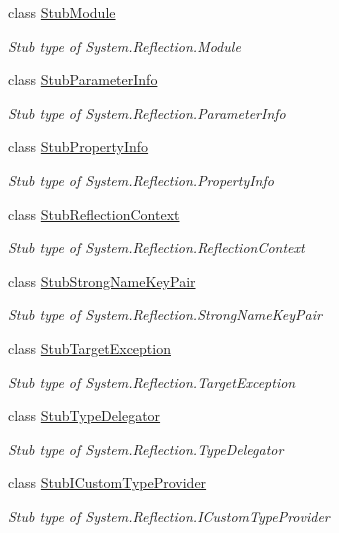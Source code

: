 \begin{DoxyCompactItemize}
class \hyperlink{class_system_1_1_reflection_1_1_fakes_1_1_stub_module}{Stub\-Module}
\begin{DoxyCompactList}\small\item\em Stub type of System.\-Reflection.\-Module\end{DoxyCompactList}\item 
class \hyperlink{class_system_1_1_reflection_1_1_fakes_1_1_stub_parameter_info}{Stub\-Parameter\-Info}
\begin{DoxyCompactList}\small\item\em Stub type of System.\-Reflection.\-Parameter\-Info\end{DoxyCompactList}\item 
class \hyperlink{class_system_1_1_reflection_1_1_fakes_1_1_stub_property_info}{Stub\-Property\-Info}
\begin{DoxyCompactList}\small\item\em Stub type of System.\-Reflection.\-Property\-Info\end{DoxyCompactList}\item 
class \hyperlink{class_system_1_1_reflection_1_1_fakes_1_1_stub_reflection_context}{Stub\-Reflection\-Context}
\begin{DoxyCompactList}\small\item\em Stub type of System.\-Reflection.\-Reflection\-Context\end{DoxyCompactList}\item 
class \hyperlink{class_system_1_1_reflection_1_1_fakes_1_1_stub_strong_name_key_pair}{Stub\-Strong\-Name\-Key\-Pair}
\begin{DoxyCompactList}\small\item\em Stub type of System.\-Reflection.\-Strong\-Name\-Key\-Pair\end{DoxyCompactList}\item 
class \hyperlink{class_system_1_1_reflection_1_1_fakes_1_1_stub_target_exception}{Stub\-Target\-Exception}
\begin{DoxyCompactList}\small\item\em Stub type of System.\-Reflection.\-Target\-Exception\end{DoxyCompactList}\item 
class \hyperlink{class_system_1_1_reflection_1_1_fakes_1_1_stub_type_delegator}{Stub\-Type\-Delegator}
\begin{DoxyCompactList}\small\item\em Stub type of System.\-Reflection.\-Type\-Delegator\end{DoxyCompactList}\item 
class \hyperlink{class_system_1_1_reflection_1_1_fakes_1_1_stub_i_custom_type_provider}{Stub\-I\-Custom\-Type\-Provider}
\begin{DoxyCompactList}\small\item\em Stub type of System.\-Reflection.\-I\-Custom\-Type\-Provider\end{DoxyCompactList}\end{DoxyCompactItemize}
